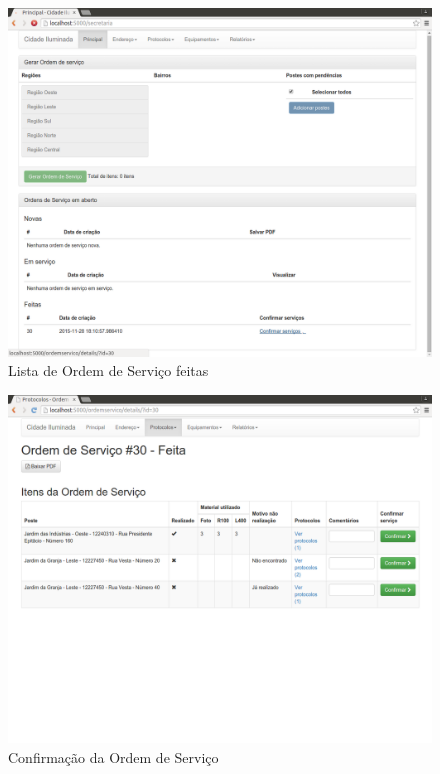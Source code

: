 \documentclass[
	article,			%
	11pt,				%
	oneside,			%
	a4paper,			%
	english,			%
	brazil,				%
	sumario=tradicional
	]{abntex2}
\begin{document}
\begin{figure}[!htbp]
 \centering
 \caption{\label{site-os-confirmacao}Lista de Ordem de Serviço feitas}
 \includegraphics[scale=0.25]{site/18-os_confirmacao.png}
\end{figure}

\begin{figure}[!htbp]
 \centering
 \caption{\label{site-os-confirmando}Confirmação da Ordem de Serviço}
 \includegraphics[scale=0.25]{site/19-os_confirmando.png}
\end{figure}
\end{document}
